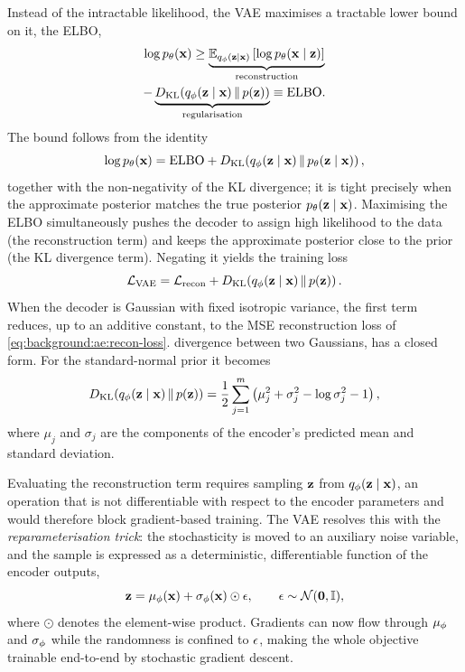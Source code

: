 Instead of the intractable likelihood, the \ac{VAE} maximises a tractable lower
bound on it, the \ac{ELBO},
\begin{multline} \label{eq:background:ae:elbo}
    \log p_{\theta}(\vb{x}) \ge \underbrace{\mathbb{E}_{q_{\phi}(\vb{z} \mid
    \vb{x})}\left[\log p_{\theta}(\vb{x} \mid \vb{z})\right]}_{\text{reconstruction}}\\
    - \underbrace{D_{\mathrm{KL}}\!\left(q_{\phi}(\vb{z} \mid \vb{x}) \,\middle\|\, p(\vb{z})\right)}_{\text{regularisation}} \equiv \mathrm{ELBO}.
\end{multline}
The bound follows from the identity
\begin{equation*}
    \log p_{\theta}(\vb{x}) = \mathrm{ELBO} +
    D_{\mathrm{KL}}\!\left(q_{\phi}(\vb{z} \mid \vb{x}) \,\middle\|\, p_{\theta}(\vb{z} \mid \vb{x})\right),
\end{equation*}
together with the non-negativity of the \ac{KL} divergence; it is tight
precisely when the approximate posterior matches the true posterior
$p_{\theta}(\vb{z} \mid \vb{x})$.
Maximising the \ac{ELBO} simultaneously pushes the decoder to assign high
likelihood to the data (the reconstruction term) and keeps the approximate
posterior close to the prior (the \ac{KL} divergence term). Negating it yields
the training loss
\begin{equation} \label{eq:background:ae:vae-loss}
    \mathcal{L}_{\mathrm{VAE}} = \mathcal{L}_{\mathrm{recon}} +
    D_{\mathrm{KL}}\!\left(q_{\phi}(\vb{z} \mid \vb{x}) \,\middle\|\, p(\vb{z})\right).
\end{equation}
When the decoder is Gaussian with fixed isotropic variance, the first term
reduces, up to an additive constant, to the \ac{MSE} reconstruction loss of
\cref{eq:background:ae:recon-loss}. %
divergence between two Gaussians, has a closed form. For the standard-normal
prior it becomes
\begin{equation*}
    D_{\mathrm{KL}}\!\left(q_{\phi}(\vb{z} \mid \vb{x}) \,\middle\|\, p(\vb{z})\right) =
    \frac{1}{2} \sum_{j=1}^{m} \left(\mu_{j}^{2} + \sigma_{j}^{2} - \log \sigma_{j}^{2} - 1\right),
\end{equation*}
where $\mu_{j}$ and $\sigma_{j}$ are the components of the encoder's predicted
mean and standard deviation.

Evaluating the reconstruction term requires sampling $\vb{z}$ from
$q_{\phi}(\vb{z} \mid \vb{x})$, an operation that is not differentiable
with respect to the encoder parameters and would therefore block gradient-based
training. The \ac{VAE} resolves this with the \textit{reparameterisation trick}:
the stochasticity is moved to an auxiliary noise variable, and the sample is
expressed as a deterministic, differentiable function of the encoder outputs,
\begin{equation*}
    \vb{z} = \vb{\mu}_{\phi}(\vb{x}) +
    \vb{\sigma}_{\phi}(\vb{x}) \odot \vb{\epsilon}, \qquad
    \vb{\epsilon} \sim \mathcal{N}(\vb{0}, \mathbb{I}),
\end{equation*}
where $\odot$ denotes the element-wise product. Gradients can now flow through
$\vb{\mu}_{\phi}$ and $\vb{\sigma}_{\phi}$ while the
randomness is confined to $\vb{\epsilon}$, making the whole objective
trainable end-to-end by stochastic gradient descent.

